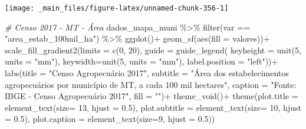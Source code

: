 \documentclass[
  brazilian,
]{book}
\newenvironment{Shaded}{\begin{snugshade}}{\end{snugshade}}
\newcommand{\AttributeTok}[1]{\textcolor[rgb]{0.77,0.63,0.00}{#1}}
\newcommand{\CommentTok}[1]{\textcolor[rgb]{0.56,0.35,0.01}{\textit{#1}}}
\newcommand{\DecValTok}[1]{\textcolor[rgb]{0.00,0.00,0.81}{#1}}
\newcommand{\FloatTok}[1]{\textcolor[rgb]{0.00,0.00,0.81}{#1}}
\newcommand{\FunctionTok}[1]{\textcolor[rgb]{0.00,0.00,0.00}{#1}}
\newcommand{\NormalTok}[1]{#1}
\newcommand{\SpecialCharTok}[1]{\textcolor[rgb]{0.00,0.00,0.00}{#1}}
\newcommand{\StringTok}[1]{\textcolor[rgb]{0.31,0.60,0.02}{#1}}
\begin{document}
\begin{center}\texttt{[image: \_main\_files/figure-latex/unnamed-chunk-356-1]} \end{center}

\begin{Shaded}
\begin{Highlighting}[]
\CommentTok{\# Censo 2017 {-} MT {-} Área}
\NormalTok{dados\_mapa\_muni }\SpecialCharTok{\%\textgreater{}\%} 
  \FunctionTok{filter}\NormalTok{(var }\SpecialCharTok{==} \StringTok{"area\_estab\_100mil\_ha"}\NormalTok{) }\SpecialCharTok{\%\textgreater{}\%}
  \FunctionTok{ggplot}\NormalTok{()}\SpecialCharTok{+}
  \FunctionTok{geom\_sf}\NormalTok{(}\FunctionTok{aes}\NormalTok{(}\AttributeTok{fill =}\NormalTok{ valores))}\SpecialCharTok{+}
  \FunctionTok{scale\_fill\_gradient2}\NormalTok{(}\AttributeTok{limits =} \FunctionTok{c}\NormalTok{(}\DecValTok{0}\NormalTok{, }\DecValTok{20}\NormalTok{),}
                       \AttributeTok{guide =} \FunctionTok{guide\_legend}\NormalTok{(}
                         \AttributeTok{keyheight =} \FunctionTok{unit}\NormalTok{(}\DecValTok{5}\NormalTok{, }\AttributeTok{units =} \StringTok{"mm"}\NormalTok{),}
                         \AttributeTok{keywidth=}\FunctionTok{unit}\NormalTok{(}\DecValTok{5}\NormalTok{, }\AttributeTok{units =} \StringTok{"mm"}\NormalTok{),}
                         \AttributeTok{label.position =} \StringTok{"left"}\NormalTok{))}\SpecialCharTok{+}
  \FunctionTok{labs}\NormalTok{(}\AttributeTok{title =} \StringTok{"Censo Agropecuário 2017"}\NormalTok{,}
       \AttributeTok{subtitle =} \StringTok{"Área dos estabelecimentos agropecuários por município de MT, a cada 100 mil hectares"}\NormalTok{,}
       \AttributeTok{caption =} \StringTok{"Fonte: IBGE {-} Censo Agropecuário 2017"}\NormalTok{,}
       \AttributeTok{fill =} \StringTok{""}\NormalTok{)}\SpecialCharTok{+}
  \FunctionTok{theme\_void}\NormalTok{()}\SpecialCharTok{+}
  \FunctionTok{theme}\NormalTok{(}\AttributeTok{plot.title =} \FunctionTok{element\_text}\NormalTok{(}\AttributeTok{size=} \DecValTok{13}\NormalTok{, }\AttributeTok{hjust =} \FloatTok{0.5}\NormalTok{),}
        \AttributeTok{plot.subtitle =} \FunctionTok{element\_text}\NormalTok{(}\AttributeTok{size=} \DecValTok{10}\NormalTok{, }\AttributeTok{hjust =} \FloatTok{0.5}\NormalTok{),}
        \AttributeTok{plot.caption =} \FunctionTok{element\_text}\NormalTok{(}\AttributeTok{size=}\DecValTok{9}\NormalTok{, }\AttributeTok{hjust =} \FloatTok{0.5}\NormalTok{))}
\end{Highlighting}
\end{Shaded}
\end{document}
